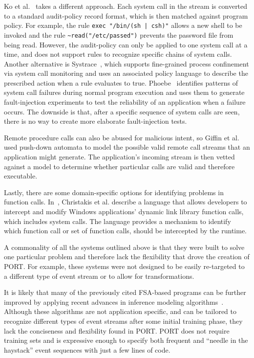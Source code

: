 Ko et al.~\cite{DBLP:conf/acsac/KoFL94}
takes a different approach.
Each system call in the
stream is converted to a standard audit-policy record format, which is then
matched against program policy. For example,
the rule \lstinline+exec "/bin/(sh | csh)"+ allows a new shell to be invoked and the rule
\lstinline+~read("/etc/passed")+ prevents the password file from being read.
However, the audit-policy can only be applied to
one system call at a time,
and does not support rules to recognize specific chains of system calls.
Another alternative is
Systrace~\cite{DBLP:conf/uss/Provos03},
which
supports fine-grained process confinement
via system call monitoring and uses an associated policy language
to describe the prescribed action when a rule evaluates to true.
Phoebe~\cite{DBLP:journals/corr/abs-2006-04444}
identifies patterns of system call failures during normal program execution
and uses them to generate fault-injection experiments
to test the reliability of an application when a failure occurs.
The downside is that, after a specific sequence of system calls are seen, there is no way to create more elaborate fault-injection
tests.

Remote procedure calls can also be abused for malicious
intent,
so Giffin et al. ~\cite{DBLP:conf/uss/GiffinJM02} used
push-down automata to model the possible valid
remote call streams that an application might generate.
The application's incoming stream
is then vetted against a model
to determine whether particular calls are valid and therefore executable.

Lastly, there are some domain-specific options for
identifying problems
in function calls.
In~\cite{DBLP:conf/icse/ChristakisEG017}, Christakis et al. describe a language that allows developers to intercept and modify
Windows applications’ dynamic link library function calls, which includes system
calls. The language provides a mechanism to identify which
function call or set of function calls, should be
intercepted by the runtime.

A commonality
of all the systems
outlined above
is that they were built to solve one particular problem
and
therefore lack the flexibility that drove the creation of PORT.
For example, these systems were not designed to be easily re-targeted
to a different type of event stream or to allow for transformations.

It is likely that many of the previously cited FSA-based programs can be further improved by applying recent advances in inference modeling algorithms~\cite{MarianiPS17,WalkinshawTD13,EmamM18,BeschastnikhBEK14}. Although these algorithms are not application specific, and can be tailored to recognize different types of event streams after some initial training phase, they lack the conciseness and flexibility found in PORT. PORT does not require training sets and is expressive enough to specify both frequent and  “needle in the haystack” event sequences with just a few lines of code.


